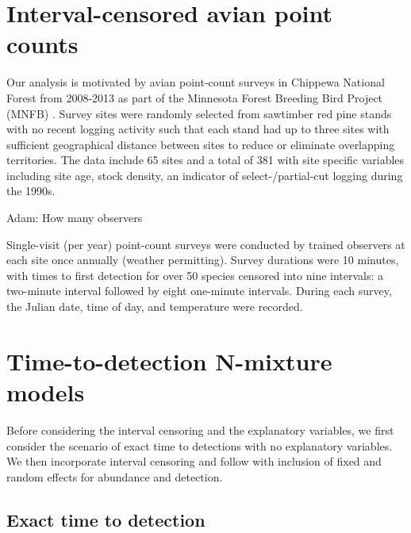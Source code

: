 \documentclass[useAMS,usenatbib,referee,12pt]{article}
\newcommand{\jarad}[1]{{\color{Orange} #1}}
\begin{document}
\section{Interval-censored avian point counts}\label{sec:data}

Our analysis is motivated by avian point-count surveys in Chippewa National Forest from 2008-2013 as part of the Minnesota Forest Breeding Bird Project (MNFB) \citet{Hanowski1995}.  
Survey sites were randomly selected from sawtimber red pine stands with no recent logging activity such that each stand had up to three sites with sufficient geographical distance between sites to reduce or eliminate overlapping territories.
The data include 65 sites and a total of 381 with site specific variables including site age,  stock density, an indicator of select-/partial-cut logging during the 1990s. 





\jarad{Adam: How many observers}

Single-visit (per year) point-count surveys were conducted by trained observers at each site once annually (weather permitting).  
Survey durations were 10 minutes, with times to first detection for over 50 species censored into nine intervals: a two-minute interval followed by eight one-minute intervals.  
During each survey, the Julian date, time of day, and temperature were recorded. 

\section{Time-to-detection N-mixture models}

Before considering the interval censoring and the explanatory variables, we first consider the scenario of exact time to detections with no explanatory variables. 
We then incorporate interval censoring and follow with inclusion of fixed and random effects for abundance and detection. 

\subsection{Exact time to detection}
\end{document}
